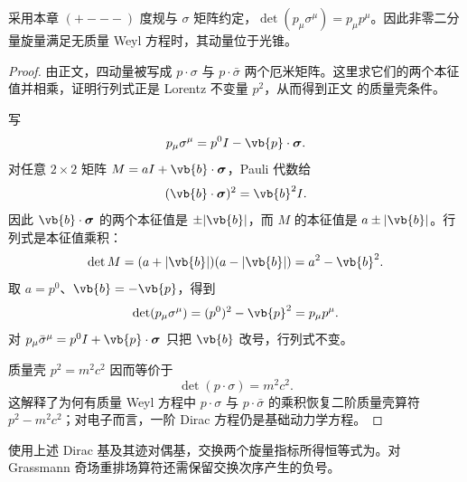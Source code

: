 \begin{proposition}
采用本章 $(+---)$ 度规与 $\sigma$ 矩阵约定，$\det(p_\mu\sigma^\mu)=p_\mu p^\mu$。因此非零二分量旋量满足无质量 Weyl 方程时，其动量位于光锥。
\end{proposition}

\begin{proof}
由正文，四动量被写成 $p\cdot\sigma$ 与 $p\cdot\bar\sigma$ 两个厄米矩阵。这里求它们的两个本征值并相乘，证明行列式正是 Lorentz 不变量 $p^2$，从而得到正文 的质量壳条件。



写
\begin{equation*}
 p_\mu\sigma^\mu=p^0I-\vb{p}\cdot\boldsymbol\sigma.
\end{equation*}
对任意 $2\times2$ 矩阵 $M=aI+\vb{b}\cdot\boldsymbol\sigma$，Pauli 代数给
\begin{equation*}
 (\vb{b}\cdot\boldsymbol\sigma)^2=\vb{b}^2I.
\end{equation*}
因此 $\vb{b}\cdot\boldsymbol\sigma$ 的两个本征值是 $\pm|\vb{b}|$，而 $M$ 的本征值是 $a\pm|\vb{b}|$。行列式是本征值乘积：
\begin{equation*}
 \det M=(a+|\vb{b}|)(a-|\vb{b}|)=a^2-\vb{b}^2.
\end{equation*}
取 $a=p^0$、$\vb{b}=-\vb{p}$，得到
\begin{equation*}
 \det(p_\mu\sigma^\mu)
 =(p^0)^2-\vb{p}^2=p_\mu p^\mu.
\end{equation*}
对 $p_\mu\bar\sigma^\mu=p^0I+\vb{p}\cdot\boldsymbol\sigma$ 只把 $\vb{b}$ 改号，行列式不变。

质量壳 $p^2=m^2c^2$ 因而等价于
\begin{equation*}
 \det(p\cdot\sigma)=m^2c^2.
\end{equation*}
这解释了为何有质量 Weyl 方程中 $p\cdot\sigma$ 与 $p\cdot\bar\sigma$ 的乘积恢复二阶质量壳算符 $p^2-m^2c^2$；对电子而言，一阶 Dirac 方程仍是基础动力学方程。
\end{proof}

\begin{proposition}
使用上述 Dirac 基及其迹对偶基，交换两个旋量指标所得恒等式为。对 Grassmann 奇场重排场算符还需保留交换次序产生的负号。
\end{proposition}

